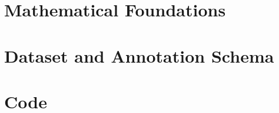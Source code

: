 \documentclass[12pt,oneside]{report}
\begin{document}
\begin{appendices}

\chapter{Mathematical Foundations}
\label{app:math}


\chapter{Dataset and Annotation Schema}
\label{app:data}


\chapter{Code}
\label{app:code}

\end{appendices}

\printbibliography[heading=bibintoc,title={References}]
\end{document}

